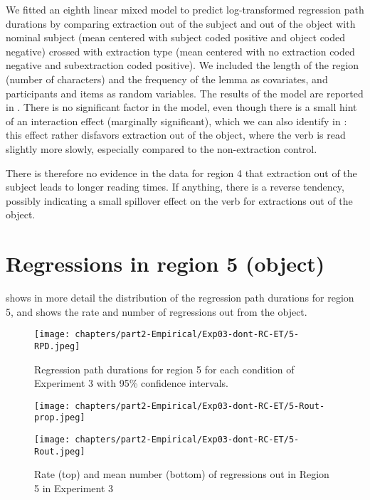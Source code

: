 

We fitted an eighth linear mixed model to predict log-transformed regression path durations by comparing extraction out of the subject and out of the object with nominal subject (mean centered with subject coded positive and object coded negative) crossed with extraction type (mean centered with no extraction coded negative and subextraction coded positive). We included the length of the region (number of characters) and the frequency of the lemma as covariates, and participants and items as random variables. 
The results of the model are reported in . There is no significant factor in the model, even though there is a small hint of an interaction effect (marginally significant), which we can also identify in : this effect rather disfavors extraction out of the object, where the verb is read slightly more slowly, especially compared to the non-extraction control. 



There is therefore no evidence in the data for region 4 that extraction out of the subject leads to longer reading times. If anything, there is a reverse tendency, possibly indicating a small spillover effect on the verb for extractions out of the object.

\section{Regressions in region 5 (object)}

 shows in more detail the distribution of the regression path durations for region 5, and  shows the rate and number of regressions out from the object.  

\begin{figure}
    \centering
    \texttt{[image: chapters/part2-Empirical/Exp03-dont-RC-ET/5-RPD.jpeg]}
    \caption{Regression path durations for region 5 for each condition of Experiment 3 with 95\% confidence intervals.}
    \label{fig:exp03-5-RPD}
\end{figure}

\begin{figure}
    \centering
    \texttt{[image: chapters/part2-Empirical/Exp03-dont-RC-ET/5-Rout-prop.jpeg]}
    
    \texttt{[image: chapters/part2-Empirical/Exp03-dont-RC-ET/5-Rout.jpeg]}
    \caption{Rate (top) and mean number (bottom) of regressions out in Region 5 in Experiment 3}
    \label{fig:exp03-5-Rout-prop}
\end{figure}

